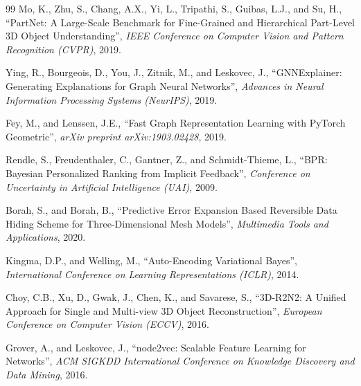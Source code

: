 \documentclass[12pt,oneside,a4paper]{report}
\begin{document}
\begin{thebibliography}{99}
 Mo, K., Zhu, S., Chang, A.X., Yi, L., Tripathi, S.,
Guibas, L.J., and Su, H., ``PartNet: A Large-Scale Benchmark for Fine-Grained
and Hierarchical Part-Level 3D Object Understanding'', \textit{IEEE
Conference on Computer Vision and Pattern Recognition (CVPR)}, 2019.

 Ying, R., Bourgeois, D., You, J., Zitnik, M.,
and Leskovec, J., ``GNNExplainer: Generating Explanations for Graph Neural
Networks'', \textit{Advances in Neural Information Processing Systems
(NeurIPS)}, 2019.

 Fey, M., and Lenssen, J.E., ``Fast Graph Representation
Learning with PyTorch Geometric'', \textit{arXiv preprint arXiv:1903.02428},
2019.

 Rendle, S., Freudenthaler, C., Gantner, Z., and
Schmidt-Thieme, L., ``BPR: Bayesian Personalized Ranking from Implicit
Feedback'', \textit{Conference on Uncertainty in Artificial Intelligence
(UAI)}, 2009.

 Borah, S., and Borah, B., ``Predictive Error
Expansion Based Reversible Data Hiding Scheme for Three-Dimensional Mesh
Models'', \textit{Multimedia Tools and Applications}, 2020.

 Kingma, D.P., and Welling, M., ``Auto-Encoding
Variational Bayes'', \textit{International Conference on Learning
Representations (ICLR)}, 2014.

 Choy, C.B., Xu, D., Gwak, J., Chen, K., and
Savarese, S., ``3D-R2N2: A Unified Approach for Single and Multi-view 3D
Object Reconstruction'', \textit{European Conference on Computer Vision
(ECCV)}, 2016.

 Grover, A., and Leskovec, J., ``node2vec:
Scalable Feature Learning for Networks'', \textit{ACM SIGKDD International
Conference on Knowledge Discovery and Data Mining}, 2016.

\end{thebibliography}
\end{document}
